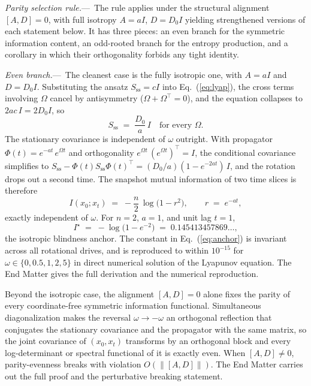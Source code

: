 \documentclass[%
 reprint,
 superscriptaddress,
 nofootinbib,
 nobibnotes,
 amsmath,amssymb,
 aps,
 prl,
 floatfix,
]{revtex4-2}
\newcommand{\Sss}{S_{\mathrm{ss}}}
\newcommand{\Ie}{I^{\!\star}}
\newcommand{\plsection}[1]{\par\medskip\noindent\textit{#1.}---\,\ignorespaces}
\newcommand{\plsubsection}[1]{\par\smallskip\noindent\textit{#1.}---\,\ignorespaces}
\begin{document}
\plsection{Parity selection rule}%
The rule applies under the structural alignment $[A,D] = 0$, with full isotropy $A = a I$, $D = D_0 I$ yielding strengthened versions of each statement below. It has three pieces: an even branch for the symmetric information content, an odd-rooted branch for the entropy production, and a corollary in which their orthogonality forbids any tight identity.

\plsubsection{Even branch}%
The cleanest case is the fully isotropic one, with $A = a I$ and $D = D_0 I$. Substituting the ansatz $\Sss = c I$ into Eq.~(\ref{eq:lyap}), the cross terms involving $\Omega$ cancel by antisymmetry ($\Omega + \Omega^\top = 0$), and the equation collapses to $2 a c\,I = 2 D_0 I$, so
\begin{equation}\label{eq:Sss-iso}
\Sss \;=\; \frac{D_0}{a}\,I \quad \text{for every } \Omega.
\end{equation}
The stationary covariance is independent of $\omega$ outright. With propagator $\Phi(t) = e^{-a t}\,e^{\Omega t}$ and orthogonality $e^{\Omega t}\,(e^{\Omega t})^\top = I$, the conditional covariance simplifies to $\Sss - \Phi(t)\Sss\Phi(t)^\top = (D_0/a)(1 - e^{-2 a t})\,I$, and the rotation drops out a second time. The snapshot mutual information of two time slices is therefore
\begin{equation}\label{eq:MI-iso}
I(x_0; x_t) \;=\; -\frac{n}{2}\,\log\bigl(1 - r^2\bigr), \qquad r \;=\; e^{-a t},
\end{equation}
exactly independent of $\omega$. For $n = 2$, $a = 1$, and unit lag $t = 1$,
\begin{equation}\label{eq:anchor}
\Ie \;=\; -\log\bigl(1 - e^{-2}\bigr) \;=\; 0.145413457869\ldots,
\end{equation}
the isotropic blindness anchor. The constant in Eq.~(\ref{eq:anchor}) is invariant across all rotational drives, and is reproduced to within $10^{-15}$ for $\omega \in \{0, 0.5, 1, 2, 5\}$ in direct numerical solution of the Lyapunov equation. The End Matter gives the full derivation and the numerical reproduction.

Beyond the isotropic case, the alignment $[A,D]=0$ alone fixes the parity of every coordinate-free symmetric information functional. Simultaneous diagonalization makes the reversal $\omega \to -\omega$ an orthogonal reflection that conjugates the stationary covariance and the propagator with the same matrix, so the joint covariance of $(x_0, x_t)$ transforms by an orthogonal block and every log-determinant or spectral functional of it is exactly even. When $[A,D]\neq 0$, parity-evenness breaks with violation $O(\|[A,D]\|)$. The End Matter carries out the full proof and the perturbative breaking statement.
\end{document}
